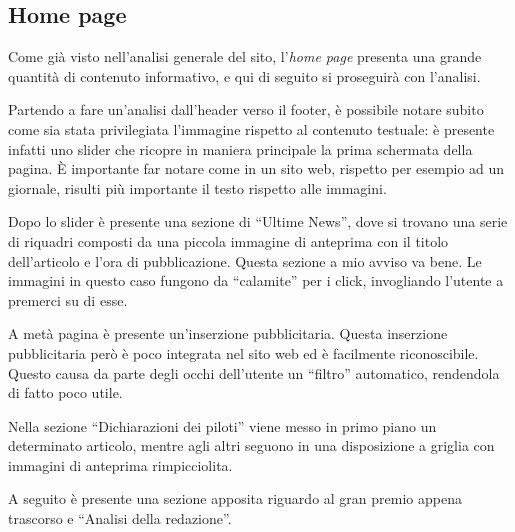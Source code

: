 \subsection{Home page}
Come già visto nell'analisi generale del sito, l'\textit{home page} presenta
una grande quantità di contenuto informativo, e qui di seguito si proseguirà con
l'analisi.

Partendo a fare un'analisi dall'header verso il footer, è possibile notare
subito come sia stata privilegiata l'immagine rispetto al contenuto testuale:
è presente infatti uno slider che ricopre in maniera principale la prima
schermata della pagina. È importante far notare come in un sito web, rispetto
per esempio ad un giornale, risulti più importante il testo rispetto alle
immagini.

Dopo lo slider è presente una sezione di ``Ultime News'', dove si trovano
una serie di riquadri composti da una piccola immagine di anteprima con il
titolo dell'articolo e l'ora di pubblicazione. Questa sezione a mio avviso va
bene. Le immagini in questo caso fungono da ``calamite'' per i click,
invogliando l'utente a premerci su di esse.

A metà pagina è presente un'inserzione pubblicitaria. Questa inserzione
pubblicitaria però è poco integrata nel sito web ed è facilmente riconoscibile.
Questo causa da parte degli occhi dell'utente un ``filtro'' automatico,
rendendola di fatto poco utile.

Nella sezione ``Dichiarazioni dei piloti'' viene messo in primo piano un
determinato articolo, mentre agli altri seguono in una disposizione a griglia
con immagini di anteprima rimpicciolita.

A seguito è presente una sezione apposita riguardo al gran premio appena
trascorso e ``Analisi della redazione''.
